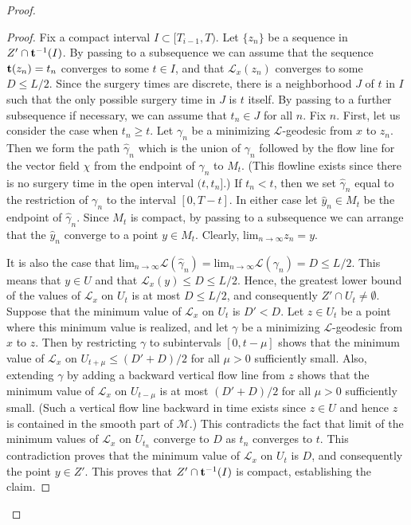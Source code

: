 \begin{proof}
\begin{proof}
Fix a compact interval $I\subset [T_{i-1},T)$. Let $\{z_n\}$ be a
sequence in $Z'\cap {\bf t}^{-1}(I)$. By passing to a subsequence we
can assume that the sequence ${\bf t}(z_n)=t_n$ converges to some
$t\in I$, and that ${\mathcal L}_x(z_n)$ converges to some $D\le
L/2$. Since the surgery times are discrete, there is a neighborhood
$J$ of $t$ in $I$ such that the only possible surgery time in $J$ is
$t$ itself. By passing to a further subsequence if necessary, we can
assume that $t_n\in J$ for all $n$. Fix $n$. First, let us consider
the case when $t_n\ge t$. Let $\gamma_n$ be a minimizing ${\mathcal
L}$-geodesic from $x$ to $z_n$. Then we form the path $\widehat
\gamma_n$ which is the union of $\gamma_n$ followed by the flow line
for the vector field $\chi$ from the endpoint of $\gamma_n$ to
$M_t$. (This flowline exists since there is no surgery time in the
open interval $(t,t_n]$.) If $t_n<t$, then we set $\widehat
\gamma_n$ equal to the restriction of $\gamma_n$ to the interval
$[0,T-t]$. In either case let $\hat y_n\in M_t$ be the endpoint of
$\widehat\gamma_n$. Since $M_t$ is compact, by passing to a
subsequence we can arrange that the $\hat y_n$ converge to a point $y\in
M_t$. Clearly,
 $\mathrm{lim}_{n\rightarrow\infty }z_n=y$.

It is also the case that $\mathrm{lim}_{n\rightarrow\infty}{\mathcal L}(\widehat\gamma_n)=
\mathrm{lim}_{n\rightarrow\infty}{\mathcal L}(\gamma_n)=D\le L/2$. This
means that $y\in U$ and that ${\mathcal L}_x(y)\le D\le L/2$. Hence,
the greatest lower bound of the values of ${\mathcal L}_x$ on $U_t$
is at most $D\le L/2$, and consequently $Z'\cap U_t\not=\emptyset$.
Suppose that the minimum value of ${\mathcal L}_x$ on $U_t$ is
$D'<D$. Let $z\in U_t$ be a point where this minimum value is
realized, and let $\gamma$ be a minimizing ${\mathcal L}$-geodesic
from $x$ to $z$. Then by restricting $\gamma$ to subintervals
$[0,t-\mu]$ shows that the minimum value of ${\mathcal L}_x$ on
$U_{t+\mu}\le (D'+D)/2$ for all $\mu>0$ sufficiently small. Also,
extending $\gamma$ by adding a backward vertical flow line from $z$
shows that the minimum value of ${\mathcal L}_x$ on $U_{t-\mu}$ is
at most $(D'+D)/2$ for all $\mu>0$ sufficiently small. (Such a
vertical flow line backward in time exists since $z\in U$ and hence
$z$ is contained in the smooth part of ${\mathcal M}$.) This
contradicts the fact that limit of the minimum values of ${\mathcal
L}_x$ on $U_{t_n}$ converge to $D$ as $t_n$ converges to $t$. This
contradiction proves  that the minimum value of ${\mathcal L}_x$ on
$U_t$ is $D$, and consequently the point $y\in Z'$. This proves that
$Z'\cap {\bf t}^{-1}(I)$ is compact, establishing the claim.
\end{proof}


\end{proof}
